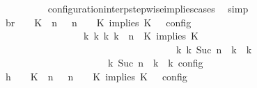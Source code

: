 \begin{isabellebody}
\ \ \ \ \ \ \ \ \isamarkupfalse%
\ configuration{\isacharunderscore}interp{\isacharunderscore}stepwise{\isacharunderscore}implies{\isacharunderscore}cases\ \isamarkupfalse%
\ simp\isanewline
\ \ \ \ \ \ \isamarkupfalse%
\ \isamarkupfalse%
\ br{}{\isacharcolon}\ {\isacartoucheopen}{\isasymrho}\ {\isasymin}\ {\isasymlbrakk}\ {\isacharparenleft}{\isacharparenleft}K\ {\isasymnot}{\isasymUp}\ n{\isacharparenright}\ {\isacharhash}\ {\isasymGamma}{\isacharparenright}{\isacharcomma}\ n\ {\isasymturnstile}\ {\isasymPsi}\ {\isasymtriangleright}\ {\isacharparenleft}{\isacharparenleft}K\ implies\ K\ {\isacharhash}\ {\isasymPhi}{\isacharparenright}\ {\isasymrbrakk}\isactrlsub c\isactrlsub o\isactrlsub n\isactrlsub f\isactrlsub i\isactrlsub g\isanewline
\ \ \ \ \ \ \ \ \ \ \ \ \ \ \ \ {\isasymLongrightarrow}\ {\isasymexists}{\isasymGamma}\isactrlsub k\ {\isasymPsi}\isactrlsub k\ {\isasymPhi}\isactrlsub k\ k{\isachardot}\ {\isacharparenleft}{\isacharparenleft}{\isasymGamma}{\isacharcomma}\ n\ {\isasymturnstile}\ {\isacharparenleft}{\isacharparenleft}K\ implies\ K\ {\isacharhash}\ {\isasymPsi}{\isacharparenright}\ {\isasymtriangleright}\ {\isasymPhi}{\isacharparenright}\isanewline
\ \ \ \ \ \ \ \ \ \ \ \ \ \ \ \ \ \ \ \ \ \ \ \ \ \ \ \ \ \ \ \ \ \ \ \ {\isasymhookrightarrow}\isactrlbsup k\isactrlesup \ {\isacharparenleft}{\isasymGamma}\isactrlsub k{\isacharcomma}\ Suc\ n\ {\isasymturnstile}\ {\isasymPsi}\isactrlsub k\ {\isasymtriangleright}\ {\isasymPhi}\isactrlsub k{\isacharparenright}{\isacharparenright}\isanewline
\ \ \ \ \ \ \ \ \ \ \ \ \ \ \ \ \ \ {\isasymand}\ {\isasymrho}\ {\isasymin}\ {\isasymlbrakk}\ {\isasymGamma}\isactrlsub k{\isacharcomma}\ Suc\ n\ {\isasymturnstile}\ {\isasymPsi}\isactrlsub k\ {\isasymtriangleright}\ {\isasymPhi}\isactrlsub k\ {\isasymrbrakk}\isactrlsub c\isactrlsub o\isactrlsub n\isactrlsub f\isactrlsub i\isactrlsub g{\isacartoucheclose}\isanewline
\ \ \ \ \ \ \isamarkupfalse%
\ {\isacharminus}\isanewline
\ \ \ \ \ \ \ \ \isamarkupfalse%
\ h{}{\isacharcolon}\ {\isacartoucheopen}{\isasymrho}\ {\isasymin}\ {\isasymlbrakk}\ {\isacharparenleft}{\isacharparenleft}K\ {\isasymnot}{\isasymUp}\ n{\isacharparenright}\ {\isacharhash}\ {\isasymGamma}{\isacharparenright}{\isacharcomma}\ n\ {\isasymturnstile}\ {\isasymPsi}\ {\isasymtriangleright}\ {\isacharparenleft}{\isacharparenleft}K\ implies\ K\ {\isacharhash}\ {\isasymPhi}{\isacharparenright}\ {\isasymrbrakk}\isactrlsub c\isactrlsub o\isactrlsub n\isactrlsub f\isactrlsub i\isactrlsub g{\isacartoucheclose}\isanewline

\end{isabellebody}

